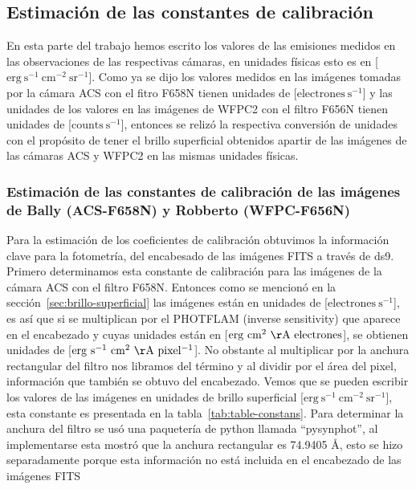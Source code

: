 \subsection{Estimación de las constantes de calibración}
\label{sec:const}
En esta parte del trabajo hemos escrito los valores de las emisiones medidos en las observaciones de las respectivas cámaras, en unidades físicas esto es en [\(\mathrm{erg\ s^{-1}\ cm^{-2}\ sr^{-1}}\)]. Como ya se dijo los valores medidos en las imágenes tomadas por la cámara ACS con el fitro F658N tienen unidades de [\(\mathrm{electrones\ s^{-1}}\)] y las unidades de los valores en las imágenes de WFPC2 con el filtro F656N tienen unidades de [\(\text{counts}\ \text{s}^{-1}\)], entonces se relizó la respectiva conversión de unidades con el propósito de tener el brillo superficial obtenidos apartir de las imágenes de las cámaras ACS y WFPC2 en las mismas unidades físicas.\\


\subsubsection{Estimación de las constantes de calibración de las imágenes de Bally (ACS-F658N) y Robberto (WFPC-F656N)}
\label{sec:acs}

Para la estimación de los coeficientes de calibración obtuvimos la información clave para la fotometría, del encabesado de las imágenes FITS a través de ds9. Primero determinamos esta constante de calibración para las imágenes de la cámara ACS con el filtro F658N. Entonces como se mencionó  en la sección~\ref{sec:brillo-superficial} las imágenes están en unidades de [\(\mathrm{electrones\ s^{-1}}\)], es así que si se multiplican por el PHOTFLAM (inverse sensitivity) que aparece en el encabezado y cuyas unidades están en [\(\mathrm{erg\ cm^{2}\ \AA{}\ electrones}\)], se obtienen unidades de [\(\mathrm{erg\ s^{-1}\ cm^{2}\ \AA{}\ pixel^{-1}}\)]. No obstante al multiplicar por la anchura rectangular del filtro nos libramos del término \A{} y al dividir por el área del pixel, información que también se obtuvo del encabezado. Vemos que se pueden escribir los valores de las imágenes en unidades de brillo superficial [\(\mathrm{erg~s^{-1}~cm^{-2}~ sr^{-1}}\)], esta constante es presentada en la tabla~\ref{tab:table-constans}. Para determinar la anchura del filtro se usó una paquetería de python llamada ``pysynphot'', al implementarse esta mostró que la anchura rectangular es 74.9405 \(\text{\AA{}}\), esto se hizo separadamente porque esta información no está incluida en el encabezado de las imágenes FITS\\

